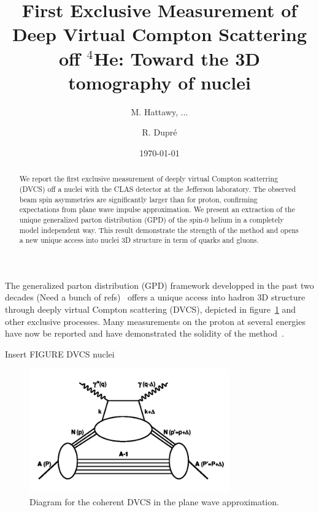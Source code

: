 \documentclass[%
 reprint,
 amsmath,amssymb,
 aps,
]{revtex4-1}
\begin{document}
\title{First Exclusive Measurement of Deep Virtual Compton Scattering off $^4$He: Toward the 3D tomography of nuclei}

\author{M. Hattawy, ...}
\author{R. Dupr\'e}

\date{\today}

\begin{abstract}
We report the first exclusive measurement of deeply virtual Compton scatterring 
(DVCS) off a nuclei with the CLAS detector at the Jefferson laboratory. The 
observed beam spin asymmetries are significantly larger than for proton, 
confirming expectations from plane wave impulse approximation. We present an 
extraction of the unique generalized parton distribution (GPD) of the spin-0 
helium in a completely model independent way. This result demonstrate the 
strength of the method and opens a new unique access into nuclei 3D structure 
in term of quarks and gluons.
\end{abstract}


\maketitle


The generalized parton distribution (GPD) framework developped in the past two decades
(Need a bunch of refs)~\cite{}
offers a unique access into hadron 3D structure through deeply virtual Compton
scattering (DVCS), depicted in figure~\ref{fig:DVCS} and other exclusive processes. Many measurements on the proton
at several energies have now be reported and have demonstrated the solidity of the
method~\cite{}. %

Insert FIGURE DVCS nuclei
\begin{figure}[htbp]
\caption{\label{fig:DVCS} Diagram for the coherent DVCS in the plane wave approximation.}
\includegraphics[width=8.6cm]{DVCS.png}
\end{figure}
\end{document}
